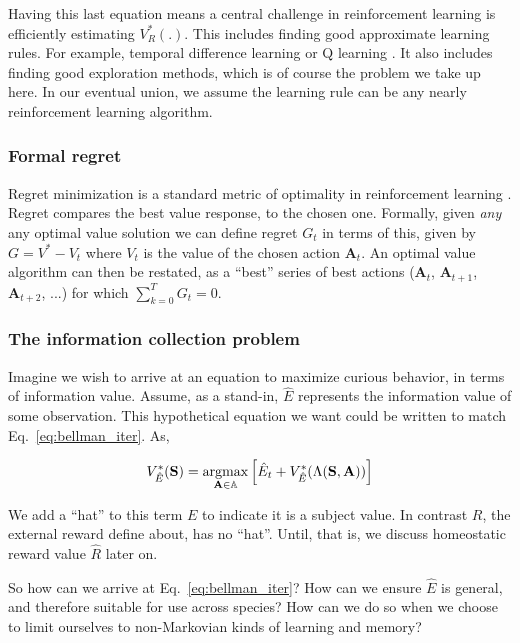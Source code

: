 Having this last equation means a central challenge in reinforcement learning is efficiently estimating $V^*_{R}(.)$. This includes finding good approximate learning rules. For example, temporal difference learning or Q learning \cite{Sutton2018}. It also includes finding good exploration methods, which is of course the problem we take up here. In our eventual union, we assume the learning rule can be any nearly reinforcement learning algorithm. 


\subsubsection*{Formal regret}
Regret minimization is a standard metric of optimality in reinforcement learning \cite{Sutton2018}. Regret compares the best value response, to the chosen one. Formally, given \emph{any} any optimal value solution we can define regret $G_t$ in terms of this, given by $G = V^* - V_t$ where $V_t$ is the value of the chosen action $\mathbf{A}_t$. An optimal value algorithm can then be restated, as a ``best'' series of best actions ($\mathbf{A}_t$, $\mathbf{A}_{t+1}$, $\mathbf{A}_{t+2}$, ...) for which $\sum_{k=0}^{T} G_t = 0$.

\subsubsection*{The information collection problem}
Imagine we wish to arrive at an equation to maximize curious behavior, in terms of information value. Assume, as a stand-in, $\hat E$ represents the information value of some observation. This hypothetical equation we want could be written to match Eq.~\ref{eq:bellman_iter}. As, 

\begin{equation} 
	\label{eq:bellman_iter_E}
	V^*_{\hat E}(\mathbf{S}) = \operatorname*{argmax}_{\mathbf{A} \in \mathbb{A}} \Big [ \hat E_{t}  + V^*_{\hat E}(\Lambda(\mathbf{S},\mathbf{A})) \Big ]
\end{equation}

We add a ``hat'' to this term $E$ to indicate it is a subject value. In contrast $R$, the external reward define about, has no ``hat''. Until, that is, we discuss homeostatic reward value $\hat R$ later on. 

So how can we arrive at Eq.~\ref{eq:bellman_iter}? How can we ensure $\hat E$ is general, and therefore suitable for use across species? How can we do so when we choose to limit ourselves to non-Markovian kinds of learning and memory? 


